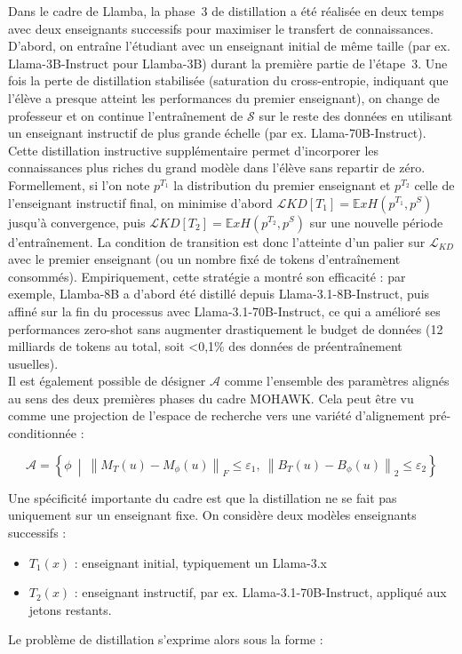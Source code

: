Dans le cadre de Llamba, la phase 3 de distillation a été réalisée en deux temps avec deux enseignants successifs pour maximiser le transfert de connaissances. D’abord, on entraîne l’étudiant avec un enseignant initial de même taille (par ex. Llama-3B-Instruct pour Llamba-3B) durant la première partie de l’étape 3. Une fois la perte de distillation stabilisée (saturation du cross-entropie, indiquant que l’élève a presque atteint les performances du premier enseignant), on change de professeur et on continue l’entraînement de $\mathcal{S}$ sur le reste des données en utilisant un enseignant instructif de plus grande échelle (par ex. Llama-70B-Instruct). Cette distillation instructive supplémentaire permet d’incorporer les connaissances plus riches du grand modèle dans l’élève sans repartir de zéro. Formellement, si l’on note $p^{T_1}$ la distribution du premier enseignant et $p^{T_2}$ celle de l'enseignant instructif final, on minimise d’abord $\mathcal{L}{KD}[T_1] = \mathbb{E}{x} H(p^{T_1}, p^S)$ jusqu’à convergence, puis $\mathcal{L}{KD}[T_2] = \mathbb{E}{x} H(p^{T_2}, p^S)$ sur une nouvelle période d’entraînement. La condition de transition est donc l’atteinte d’un palier sur $\mathcal{L}_{KD}$ avec le premier enseignant (ou un nombre fixé de tokens d’entraînement consommés). Empiriquement, cette stratégie a montré son efficacité : par exemple, Llamba-8B a d’abord été distillé depuis Llama-3.1-8B-Instruct, puis affiné sur la fin du processus avec Llama-3.1-70B-Instruct, ce qui a amélioré ses performances zero-shot sans augmenter drastiquement le budget de données (12 milliards de tokens au total, soit <0,1\% des données de préentraînement usuelles).\\


Il est également possible de désigner $\mathcal{A}$ comme l'ensemble des paramètres alignés au sens des deux premières phases du cadre MOHAWK. Cela peut être vu comme une projection de l'espace de recherche vers une variété d'alignement pré-conditionnée :

\begin{equation}
\mathcal{A} = \left\{ \phi \ \middle| \ \left\| M_T(u) - M_{\phi}(u) \right\|_F \leq \varepsilon_1,\ \left\| B_T(u) - B_{\phi}(u) \right\|_2 \leq \varepsilon_2 \right\}
\end{equation}

Une spécificité importante du cadre est que la distillation ne se fait pas uniquement sur un enseignant fixe. On considère deux modèles enseignants successifs :

\begin{itemize}
  \item $T_1(x)$ : enseignant initial, typiquement un Llama-3.x
  \item $T_2(x)$ : enseignant instructif, par ex. Llama-3.1-70B-Instruct, appliqué aux jetons restants.
\end{itemize}
Le problème de distillation s'exprime alors sous la forme :

